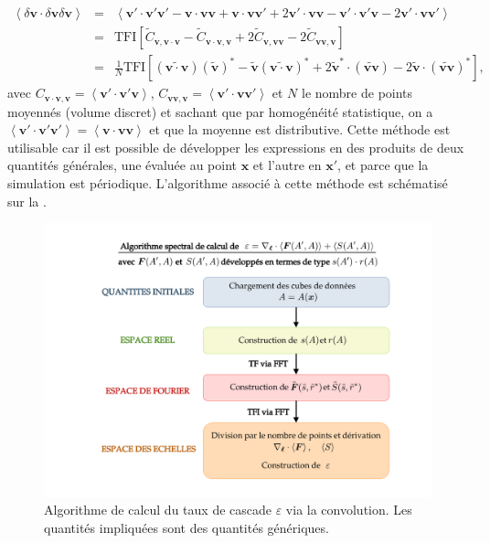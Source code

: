 \begin{eqnarray}
    \left<\delta \boldsymbol{v} \cdot \delta \boldsymbol{v} \delta \boldsymbol{v}\right> &=& \left<\boldsymbol{v'} \cdot \boldsymbol{v'} \boldsymbol{v'} - \boldsymbol{v} \cdot \boldsymbol{v} \boldsymbol{v}  + \boldsymbol{v} \cdot \boldsymbol{v} \boldsymbol{v'} + 2 \boldsymbol{v'} \cdot \boldsymbol{v} \boldsymbol{v}- \boldsymbol{v'} \cdot \boldsymbol{v'} \boldsymbol{v} - 2 \boldsymbol{v'} \cdot \boldsymbol{v} \boldsymbol{v'}\right> \nonumber\\
&=&  \text{TFI} [\widetilde{C}_{\boldsymbol{v},\boldsymbol{v} \cdot \boldsymbol{v}} - \widetilde{C}_{\boldsymbol{v} \cdot \boldsymbol{v},  \boldsymbol{v}} + 2 \widetilde{C}_{\boldsymbol{v},\boldsymbol{v}\boldsymbol{v}}  - 2 \widetilde{C}_{\boldsymbol{v}\boldsymbol{v},\boldsymbol{v}} ] \quad \nonumber  \\
&=& \frac{1}{N}  \text{TFI} [   (\widetilde{ \boldsymbol{v} \cdot \boldsymbol{v}})(\boldsymbol{\widetilde{v}})^* - \boldsymbol{\widetilde{v}} (\widetilde{\boldsymbol{v} \cdot \boldsymbol{v}})^* +2\boldsymbol{\widetilde{v}}^* \cdot (\widetilde{\boldsymbol{v} \boldsymbol{v}}) -2\boldsymbol{\widetilde{v}}\cdot (\widetilde{\boldsymbol{v} \boldsymbol{v}})^* ], \quad
\end{eqnarray}
avec $C_{\boldsymbol{v} \cdot \boldsymbol{v},  \boldsymbol{v}} = \left< \boldsymbol{v'} \cdot \boldsymbol{v'} \boldsymbol{v}\right>$, $C_{\boldsymbol{v}\boldsymbol{v},\boldsymbol{v}} = \left< \boldsymbol{v'} \cdot \boldsymbol{v} \boldsymbol{v'} \right>$ et $N$ le nombre de points moyennés (volume discret) et sachant que par homogénéité statistique, on a $\left< \boldsymbol{v'} \cdot \boldsymbol{v'} \boldsymbol{v'}\right> = \left< \boldsymbol{v} \cdot \boldsymbol{v} \boldsymbol{v}\right>$ et que la moyenne est distributive. Cette méthode est utilisable car il est possible de développer les expressions en des produits de deux quantités générales, une évaluée au point $\boldsymbol{x}$ et l'autre en $\boldsymbol{x'}$, et parce que la simulation est périodique. L'algorithme associé à cette méthode est schématisé sur la .
\begin{figure}[!ht]
 \centering
\includegraphics[width=0.9\linewidth,trim=4cm 1cm 3cm 1cm, clip=true]{./Part_3/images_ch1/code_EL_spec}
\cprotect\caption{Algorithme de calcul du taux de cascade $\varepsilon$ via la convolution. Les quantités impliquées sont des quantités génériques.}
\label{fig:algo_spec}
\end{figure}
